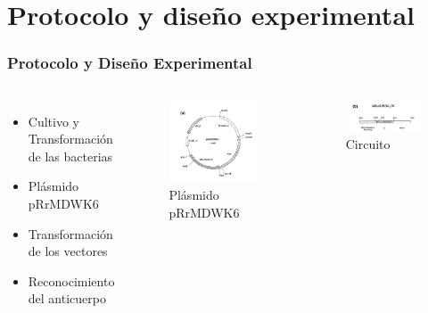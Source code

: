 \documentclass{beamer}
\begin{document}
\section{Protocolo y diseño experimental}

\begin{frame}
\frametitle{Protocolo y Diseño Experimental}
\begin{columns}[c] %
\begin{itemize}
\item Cultivo y Transformación de las bacterias
\item Plásmido pRrMDWK6
\item Transformación de los vectores
\item Reconocimiento del anticuerpo
\end{itemize}
\begin{figure}[ht!]
\includegraphics[scale=0.25]{plasmido+.PNG} 
\caption{Plásmido pRrMDWK6}
\end{figure} 
\begin{figure}[ht!]
\vspace*{-1cm}
\includegraphics[scale=0.3]{cassete.PNG} 
\caption{Circuito}
\end{figure} 
\end{columns}
\end{frame}
\end{document}
